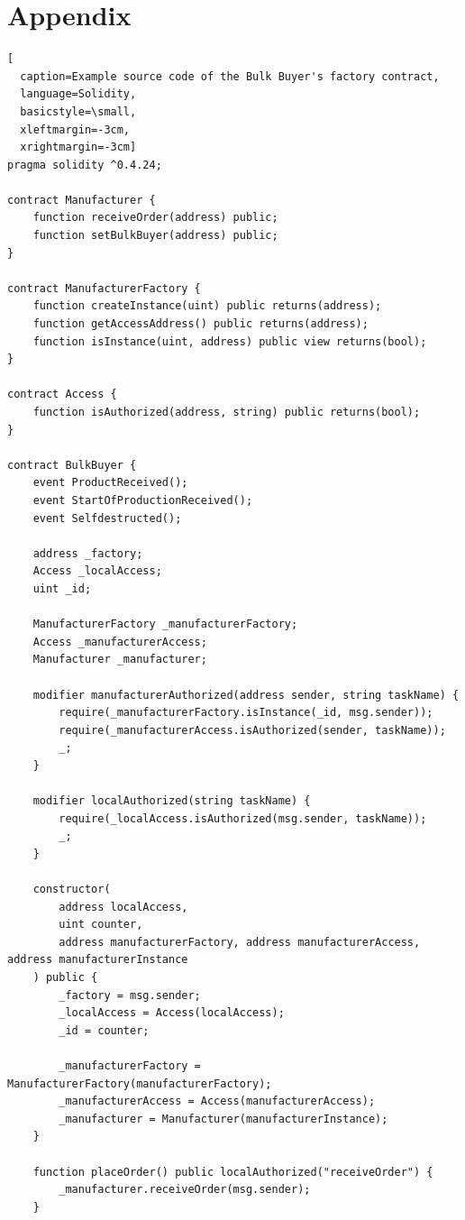 \documentclass[runningheads]{llncs}
\begin{document}
\section{Appendix}
\begin{lstlisting}[
  caption=Example source code of the Bulk Buyer's factory contract,
  language=Solidity,
  basicstyle=\small,
  xleftmargin=-3cm,
  xrightmargin=-3cm]
pragma solidity ^0.4.24;

contract Manufacturer {
    function receiveOrder(address) public;
    function setBulkBuyer(address) public;
}

contract ManufacturerFactory {
    function createInstance(uint) public returns(address);
    function getAccessAddress() public returns(address);
    function isInstance(uint, address) public view returns(bool);
}

contract Access {
    function isAuthorized(address, string) public returns(bool);
}

contract BulkBuyer {
    event ProductReceived();
    event StartOfProductionReceived();
    event Selfdestructed();

    address _factory;
    Access _localAccess;
    uint _id;

    ManufacturerFactory _manufacturerFactory;
    Access _manufacturerAccess;
    Manufacturer _manufacturer;

    modifier manufacturerAuthorized(address sender, string taskName) {
        require(_manufacturerFactory.isInstance(_id, msg.sender));
        require(_manufacturerAccess.isAuthorized(sender, taskName));
        _;
    }

    modifier localAuthorized(string taskName) {
        require(_localAccess.isAuthorized(msg.sender, taskName));
        _;
    }

    constructor(
        address localAccess,
        uint counter,
        address manufacturerFactory, address manufacturerAccess, address manufacturerInstance
    ) public {
        _factory = msg.sender;
        _localAccess = Access(localAccess);
        _id = counter;

        _manufacturerFactory = ManufacturerFactory(manufacturerFactory);
        _manufacturerAccess = Access(manufacturerAccess);
        _manufacturer = Manufacturer(manufacturerInstance);
    }

    function placeOrder() public localAuthorized("receiveOrder") {
        _manufacturer.receiveOrder(msg.sender);
    }


\end{lstlisting}
\end{document}
